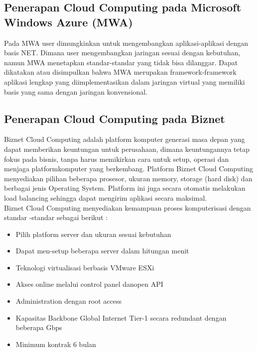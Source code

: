 \subsection{Penerapan Cloud Computing pada Microsoft Windows Azure (MWA)}
\tab Pada MWA user dimungkinkan untuk mengembangkan aplikasi-aplikasi dengan basis
NET. Dimana user mengembangkan jaringan sesuai dengan kebutuhan, namun MWA menetapkan standar-standar yang tidak bisa dilanggar. Dapat dikatakan atau disimpulkan bahwa MWA merupakan framework-framework aplikasi lengkap yang diimplementasikan dalam jaringan virtual yang memiliki basis yang sama dengan jaringan konvensional.
\subsection{Penerapan Cloud Computing pada Biznet}
\tab Biznet Cloud Computing adalah platform komputer generasi masa depan yang dapat
memberikan keuntungan untuk perusahaan, dimana keuntungannya tetap fokus pada bisnis, tanpa harus memikirkan cara untuk setup, operasi dan menjaga platformkomputer yang berkembang. Platform Biznet Cloud Computing menyediakan pilihan beberapa prosesor, ukuran memory, storage (hard disk) dan berbagai jenis Operating System. Platform ini juga secara otomatis melakukan load balancing sehingga dapat mengirim aplikasi secara maksimal. \\Biznet Cloud Computing menyediakan kemampuan proses komputerisasi dengan standar -standar sebagai berikut :
\begin{itemize}
\item Pilih platform server dan ukuran sesuai kebutuhan
\item Dapat men-setup beberapa server dalam hitungan menit
\item Teknologi virtualisasi berbasis VMware ESXi
\item Akses online melalui control panel danopen API
\item Administration dengan root access
\item Kapasitas Backbone Global Internet Tier-1 secara redundant dengan beberapa Gbps
\item Minimum kontrak 6 bulan
\end{itemize}
